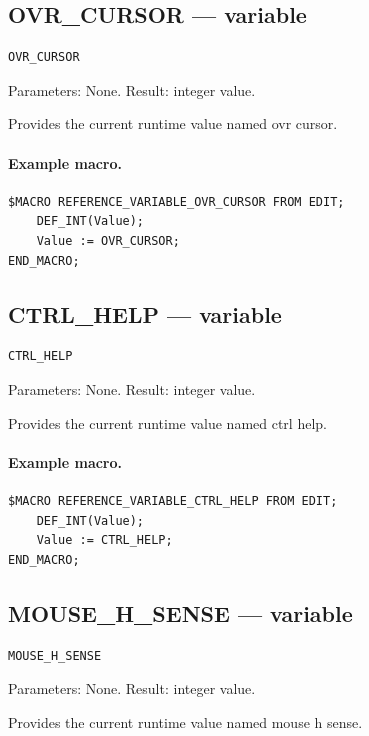 \documentclass[a4paper,10pt,twoside,openany]{book}
\begin{document}
\label{prim:variable-ovr-cursor}
\subsection*{OVR\_CURSOR --- variable}
\begin{verbatim}
OVR_CURSOR
\end{verbatim}
Parameters: None. Result: integer value.

Provides the current runtime value named ovr cursor.

\paragraph{Example macro.}
\begin{verbatim}
$MACRO REFERENCE_VARIABLE_OVR_CURSOR FROM EDIT;
    DEF_INT(Value);
    Value := OVR_CURSOR;
END_MACRO;
\end{verbatim}

\label{prim:variable-ctrl-help}
\subsection*{CTRL\_HELP --- variable}
\begin{verbatim}
CTRL_HELP
\end{verbatim}
Parameters: None. Result: integer value.

Provides the current runtime value named ctrl help.

\paragraph{Example macro.}
\begin{verbatim}
$MACRO REFERENCE_VARIABLE_CTRL_HELP FROM EDIT;
    DEF_INT(Value);
    Value := CTRL_HELP;
END_MACRO;
\end{verbatim}

\label{prim:variable-mouse-h-sense}
\subsection*{MOUSE\_H\_SENSE --- variable}
\begin{verbatim}
MOUSE_H_SENSE
\end{verbatim}
Parameters: None. Result: integer value.

Provides the current runtime value named mouse h sense.
\end{document}
